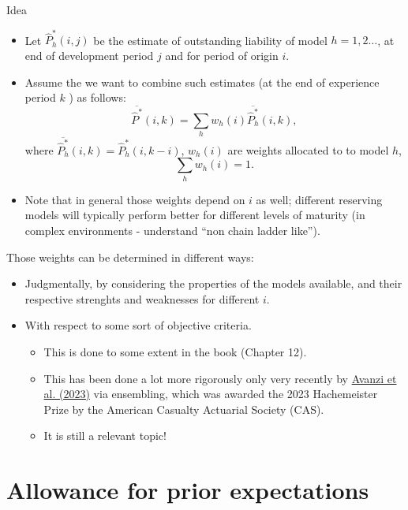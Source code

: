 \documentclass[
  ignorenonframetext,
  t,handout]{beamer}
\providecommand{\tightlist}{%
  \setlength{\itemsep}{0pt}\setlength{\parskip}{0pt}}
\begin{document}
\begin{frame}{Idea}
\begin{itemize}
\tightlist
\item
  Let \(\hat{P}_h^*(i,j)\) be the estimate of outstanding liability of
  model \(h=1,2\ldots\), at end of development period \(j\) and for
  period of origin \(i\).
\item
  Assume the we want to combine such estimates (at the end of experience
  period \(k\) ) as follows:
  \[\overline{\hat{P}^*}(i,k) = \sum_h w_h(i) \overline{\hat{P}^*_h}(i,k),\]
  where \(\overline{\hat{P}^*_h}(i,k) = \hat{P}_h^*(i,k-i)\), \(w_h(i)\)
  are weights allocated to to model \(h\), \[\sum_h w_h(i)=1.\]
\item
  Note that in general those weights depend on \(i\) as well; different
  reserving models will typically perform better for different levels of
  maturity (in complex environments - understand ``non chain ladder
  like'').
\end{itemize}
\end{frame}

\begin{frame}
Those weights can be determined in different ways:

\begin{itemize}
\tightlist
\item
  Judgmentally, by considering the properties of the models available,
  and their respective strenghts and weaknesses for different \(i\).
\item
  With respect to some sort of objective criteria.

  \begin{itemize}
  \tightlist
  \item
    This is done to some extent in the book (Chapter 12).
  \item
    This has been done a lot more rigorously only very recently by
    \href{https://arxiv.org/abs/2206.08541}{Avanzi et al. (2023)} via
    ensembling, which was awarded the 2023 Hachemeister Prize by the
    American Casualty Actuarial Society (CAS).
  \item
    It is still a relevant topic!
  \end{itemize}
\end{itemize}
\end{frame}

\section{Allowance for prior
expectations}\label{allowance-for-prior-expectations}
\end{document}
